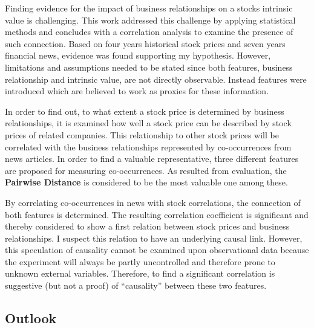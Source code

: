 
Finding evidence for the impact of business relationships on a stocks intrinsic value is challenging. This work addressed this challenge by applying statistical methods and concludes with a correlation analysis to examine the presence of such connection. Based on four years historical stock prices and seven years financial news, evidence was found supporting my hypothesis. However, limitations and assumptions needed to be stated since both features, business relationship and intrinsic value, are not directly observable. Instead features were introduced which are believed to work as proxies for these information.

In order to find out, to what extent a stock price is determined by business relationships, it is examined how well a stock price can be described by stock prices of related companies. This relationship to other stock prices will be correlated with the business relationships represented by co-occurrences from news articles. In order to find a valuable representative, three different features are proposed for measuring co-occurrences. As resulted from evaluation, the \textbf{Pairwise Distance} is considered to be the most valuable one among these.

By correlating co-occurrences in news with stock correlations, the connection of both features is determined. The resulting correlation coefficient is significant and thereby considered to show a first relation between stock prices and business relationships. I suspect this relation to have an underlying causal link. However, this speculation of causality cannot be examined upon observational data because the experiment will always be partly uncontrolled and therefore prone to unknown external variables. Therefore, to find a significant correlation is suggestive (but not a proof) of “causality” between these two features.

\subsection{Outlook}

